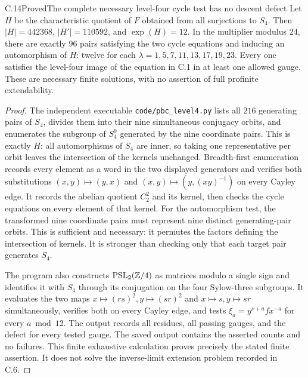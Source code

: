 \begin{statement}{C.14}{Proved}{The complete necessary level-four cycle test has no descent defect}
Let $H$ be the characteristic quotient of $F$ obtained from all
surjections to $S_4$. Then $|H|=442368$, $|H'|=110592$, and
$\exp(H)=12$. In the multiplier modulus $24$, there are exactly
$96$ pairs satisfying the two cycle equations and inducing an
automorphism of $H$: twelve for each
$\lambda=1,5,7,11,13,17,19,23$. Every one satisfies the
level-four image of the equation in C.1 in at least one allowed
gauge. These are necessary finite solutions, with no assertion of
full profinite extendability.
\end{statement}
\begin{proof}
The independent executable \texttt{code/pbc\_level4.py} lists all
$216$ generating pairs of $S_4$, divides them into their nine
simultaneous conjugacy orbits, and enumerates the subgroup of
$S_4^9$ generated by the nine coordinate pairs. This is exactly
$H$: all automorphisms of $S_4$ are inner, so taking one representative
per orbit leaves the intersection of the kernels unchanged.
Breadth-first enumeration records every element as a word in the
two displayed generators and verifies both substitutions
$(x,y)\mapsto(y,x)$ and $(x,y)\mapsto(y,(xy)^{-1})$ on every
Cayley edge. It records the abelian quotient $C_2^2$ and its kernel,
then checks the cycle equations on every element of that kernel.
For the automorphism test, the transformed nine coordinate pairs
must represent nine distinct generating-pair orbits. This is
sufficient and necessary: it permutes the factors defining the
intersection of kernels. It is stronger than checking only that
each target pair generates $S_4$.

The program also constructs $\operatorname{PSL}_2(\mathbb Z/4)$ as matrices modulo
a single sign and identifies it with $S_4$ through its conjugation
on the four Sylow-three subgroups. It evaluates the two maps
$x\mapsto(rs)^2,y\mapsto(sr)^2$ and $x\mapsto s,y\mapsto sr$
simultaneously, verifies both on every Cayley edge, and tests
$\xi_a=y^{\nu+a}fx^{-a}$ for every $a\bmod12$. The output records
all residues, all passing gauges, and the defect for every tested
gauge. The saved output contains the asserted counts and no failures.
This finite exhaustive calculation proves precisely the stated
finite assertion. It does not solve the inverse-limit extension
problem recorded in C.6.
\end{proof}

